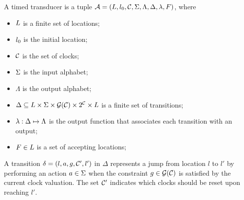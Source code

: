         \begin{definition}
            A timed transducer is a tuple $\mathcal{A}=(L,l_0,\mathcal{C},\Sigma,\Lambda,\Delta,\lambda,F)$, where
            \begin{itemize}
                \item $L$ is a finite set of locations;
                \item $l_0$ is the initial location;
                \item $\mathcal{C}$ is the set of clocks;
                \item $\Sigma$ is the input alphabet;
                \item $\Lambda$ is the output alphabet;
                \item $\Delta\subseteq L\times\Sigma\times\mathcal{G}(\mathcal{C})\times 2^{\mathcal{C}}\times L$ is a finite set of transitions;
                \item $\lambda: \Delta \mapsto \Lambda$ is the output function that associates each transition with an output;
                \item $F\in L$ is a set of accepting locations;
            \end{itemize}  
        \end{definition}

        A transition \(\delta = (l, a, g, \mathcal{C}', l')\) in \(\Delta\) represents a jump from location $l$ to $l'$ by performing an action \(a \in \Sigma\) when the constraint \(g \in \mathcal{G}(\mathcal{C})\) is satisfied by the current clock valuation. The set \(\mathcal{C}'\) indicates which clocks should be reset upon reaching $l'$.


